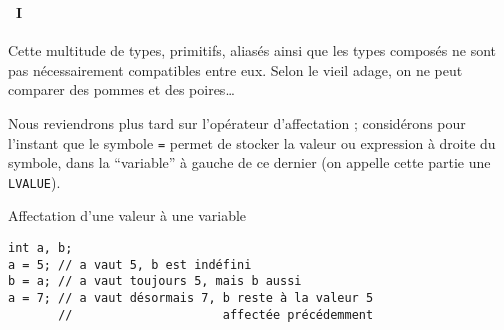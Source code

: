 \begin{frame}[containsverbatim]
  \frametitle{\secname}
  \framesubtitle{\subsecname~I} 

  Cette multitude de types, primitifs, aliasés ainsi que les types composés ne sont pas nécessairement compatibles entre eux. Selon le vieil adage, 
  on ne peut comparer des pommes et des poires\ldots
  \vspace{0.3cm}
  \par 
  Nous reviendrons plus tard sur l'opérateur d'affectation ; considérons pour l'instant que le symbole \verb|=| permet de stocker la valeur ou
  expression à droite du symbole, dans la ``variable'' à gauche de ce dernier (on appelle cette partie une \verb|LVALUE|).
  \vspace{0.3cm}
  \begin{exampleblock}{Affectation d'une valeur à une variable}
    \begin{verbatim}
int a, b;
a = 5; // a vaut 5, b est indéfini
b = a; // a vaut toujours 5, mais b aussi
a = 7; // a vaut désormais 7, b reste à la valeur 5
       //                     affectée précédemment \end{verbatim}
  \end{exampleblock}  
\end{frame}
